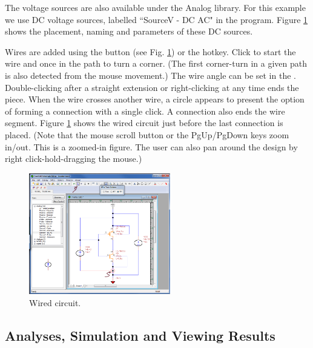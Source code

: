  The voltage sources are also available under the Analog library. For this example we use DC voltage sources, labelled ``SourceV - DC AC" in the program.  Figure \ref{fig_schematiceditor_wiredtogether} shows the placement, naming and parameters of these DC sources. 

{} Wires are added using the  button (see Fig. \ref{fig_schematiceditor_wiredtogether}) or the  hotkey.  Click to start the wire and once in the path to turn a corner.  (The first corner-turn in a given path is also detected from the mouse movement.) The wire angle can be set in the .  Double-clicking after a straight extension or right-clicking at any time ends the piece.  When the wire crosses another wire, a circle appears to present the option of forming a connection with a single click.  A connection also ends the wire segment. Figure \ref{fig_schematiceditor_wiredtogether} shows the wired circuit just before the last connection is placed. (Note that the mouse scroll button or the PgUp/PgDown keys zoom in/out. This is a zoomed-in figure. The user can also pan around the design by right click-hold-dragging the mouse.)  
\begin{figure}
    \includegraphics[width=0.55\textwidth]{./figures/getting_started_figures/SchematicEditor_addingwires.png}
    \caption{{Wired circuit.}}
  \label{fig_schematiceditor_wiredtogether}
\end{figure} 


%
\subsection{Analyses, Simulation and Viewing Results}

